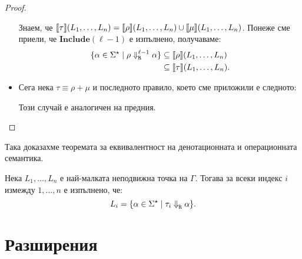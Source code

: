 \begin{proof}
\begin{itemize}
    Знаем, че $\val{\tau}(L_1,\dots,L_n) = \val{\rho}(L_1,\dots,L_n) \cup \val{\mu}(L_1,\dots,L_n)$.
    Понеже сме приели, че $\textbf{Include}(\ell-1)$ е изпълнено, получаваме:
    \begin{align*}
      \{\alpha \in \Sigma^\star \mid \rho \opsem{\ell-1}{R} \alpha\} & \subseteq \val{\rho}(L_1,\dots,L_n)\\
                                                                     & \subseteq \val{\tau}(L_1,\dots,L_n).
    \end{align*}
    
  \item
    Сега нека $\tau \equiv \rho + \mu$ и последното правило, което сме приложили е следното:
    \begin{prooftree}
    \end{prooftree}
    Този случай е аналогичен на предния.
  \end{itemize}
\end{proof}

Така доказахме теоремата за еквивалентност на денотационната и операционната семантика.

\begin{framed}
  \begin{theorem}
    Нека $L_1,\dots,L_n$ е най-малката неподвижна точка на $\Gamma$. Тогава за всеки индекс $i$ измежду $1,\dots,n$ е изпълнено, че:
    \[L_i = \{\alpha \in \Sigma^\star \mid \tau_i \opsem{}{R} \alpha\}.\]  
  \end{theorem}
\end{framed}

\section{Разширения}






